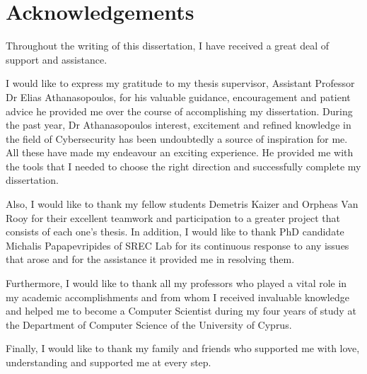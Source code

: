 \section*{\LARGE{Acknowledgements}}

Throughout the writing of this dissertation, I have received a great deal of support and assistance.

I would like to express my gratitude to my thesis supervisor, Assistant Professor Dr Elias Athanasopoulos, for his valuable guidance, encouragement and patient advice he provided me over the course of accomplishing my dissertation. During the past year, Dr Athanasopoulos interest, excitement and refined knowledge in the field of Cybersecurity has been undoubtedly a source of inspiration for me. All these have made my endeavour an exciting experience. He provided me with the tools that I needed to choose the right direction and successfully complete my dissertation.

Also, I would like to thank my fellow students Demetris Kaizer and Orpheas Van Rooy for their excellent teamwork and participation to a greater project that consists of each one's thesis. In addition, I would like to thank PhD candidate Michalis Papapevripides of SREC Lab for its continuous response to any issues that arose and for the assistance it provided me in resolving them.

Furthermore, I would like to thank all my professors who played a vital role in my academic accomplishments and from whom I received invaluable knowledge and helped me to become a Computer Scientist during my four years of study at the Department of Computer Science of the University of Cyprus.

Finally, I would like to thank my family and friends who supported me with love, understanding and supported me at every step.
